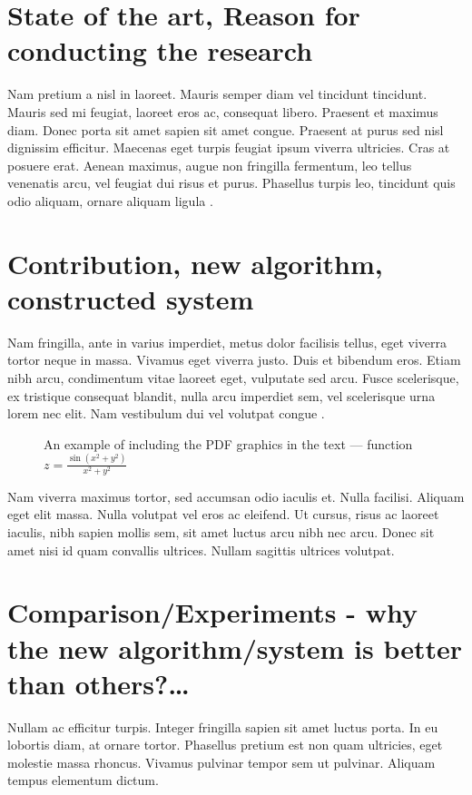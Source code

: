 \documentclass[10pt]{article}
\begin{document}
\section{State of the art, Reason for conducting the research}

Nam pretium a nisl in laoreet. Mauris semper diam vel tincidunt tincidunt. Mauris sed mi feugiat, laoreet eros ac, consequat libero. Praesent et maximus diam. Donec porta sit amet sapien sit amet congue. Praesent at purus sed nisl dignissim efficitur. Maecenas eget turpis feugiat ipsum viverra ultricies. Cras at posuere erat. Aenean maximus, augue non fringilla fermentum, leo tellus venenatis arcu, vel feugiat dui risus et purus. Phasellus turpis leo, tincidunt quis odio aliquam, ornare aliquam ligula \cite{curse}.

\section{Contribution, new algorithm, constructed system}

Nam fringilla, ante in varius imperdiet, metus dolor facilisis tellus, eget viverra tortor neque in massa. Vivamus eget viverra justo. Duis et bibendum eros. Etiam nibh arcu, condimentum vitae laoreet eget, vulputate sed arcu. Fusce scelerisque, ex tristique consequat blandit, nulla arcu imperdiet sem, vel scelerisque urna lorem nec elit. Nam vestibulum dui vel volutpat congue \cite{mixture}.

\begin{figure}[!ht]
\centering
\caption{An example of including the PDF graphics in the text ---
function $z=\frac{\sin(x^2+y^2)}{x^2+y^2}$}
\label{rys:surf}
\end{figure}

Nam viverra maximus tortor, sed accumsan odio iaculis et. Nulla facilisi. Aliquam eget elit massa. Nulla volutpat vel eros ac eleifend. Ut cursus, risus ac laoreet iaculis, nibh sapien mollis sem, sit amet luctus arcu nibh nec arcu. Donec sit amet nisi id quam convallis ultrices. Nullam sagittis ultrices volutpat.

\section{Comparison/Experiments - why the new algorithm/system is better than others?\ldots}

Nullam ac efficitur turpis. Integer fringilla sapien sit amet luctus porta. In eu lobortis diam, at ornare tortor. Phasellus pretium est non quam ultricies, eget molestie massa rhoncus. Vivamus pulvinar tempor sem ut pulvinar. Aliquam tempus elementum dictum.
\end{document}
